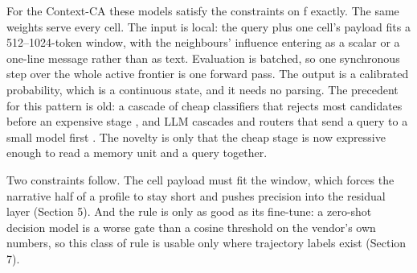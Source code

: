 \documentclass[11pt]{article}
\begin{document}
For the Context-CA these models satisfy the constraints on f exactly. The same weights serve every cell. The input is local: the query plus one cell's payload fits a 512--1024-token window, with the neighbours' influence entering as a scalar or a one-line message rather than as text. Evaluation is batched, so one synchronous step over the whole active frontier is one forward pass. The output is a calibrated probability, which is a continuous state, and it needs no parsing. The precedent for this pattern is old: a cascade of cheap classifiers that rejects most candidates before an expensive stage \cite{violajones}, and LLM cascades and routers that send a query to a small model first \cite{frugalgpt,routellm}. The novelty is only that the cheap stage is now expressive enough to read a memory unit and a query together.

Two constraints follow. The cell payload must fit the window, which forces the narrative half of a profile to stay short and pushes precision into the residual layer (Section 5). And the rule is only as good as its fine-tune: a zero-shot decision model is a worse gate than a cosine threshold on the vendor's own numbers, so this class of rule is usable only where trajectory labels exist (Section 7).

\begin{table}[t]
\centering\small
\setlength{\tabcolsep}{4pt}
\caption{Transition-function candidates.}
\end{table}
\end{document}
